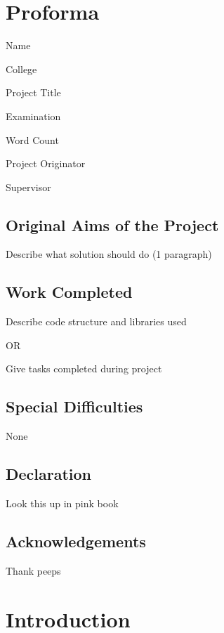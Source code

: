 \documentclass[10pt,twoside,a4paper]{report}
\begin{document}

\chapter*{Proforma}

Name

College

Project Title

Examination

Word Count

Project Originator

Supervisor

\section*{Original Aims of the Project}

Describe what solution should do (1 paragraph)

\section*{Work Completed}

Describe code structure and libraries used

OR

Give tasks completed during project

\section*{Special Difficulties}

None

\pagebreak

\section*{Declaration}

Look this up in pink book

\tableofcontents

\listoffigures

\pagebreak

\section*{Acknowledgements}

Thank peeps

\chapter{Introduction}
\end{document}
